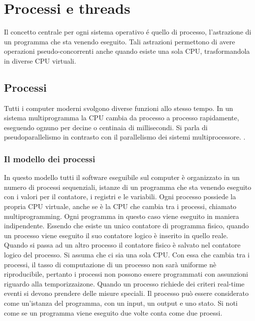 \chapter{Processi e threads}
Il concetto centrale per ogni sistema operativo \'e quello di processo, l'astrazione di un programma che sta venendo eseguito. Tali astrazioni permettono
di avere operazioni pseudo-concorrenti anche quando esiste una sola CPU, trasformandola in diverse CPU virtuali.
\section{Processi}
Tutti i computer moderni svolgono diverse funzioni allo stesso tempo. In un sistema multiprogramma la CPU cambia da processo a processo rapidamente,
eseguendo ognuno per decine o centinaia di millisecondi. Si parla di pseudoparallelismo in contrasto con il parallelismo dei sistemi multiprocessore. .
\subsection{Il modello dei processi}
In questo modello tutti il software eseguibile sul computer \`e organizzato in un numero di processi sequenziali, istanze di un programma che sta venendo eseguito con i valori per
il contatore, i registri e le variabili. Ogni processo possiede la propria CPU virtuale, anche se \`e la CPU che cambia tra i processi, chiamato multiprogramming. Ogni programma in
questo caso viene eseguito in maniera indipendente. Essendo che esiste un unico contatore di programma fisico, quando un processo viene eseguito il suo contatore logico \`e inserito
in quello reale. Quando si passa ad un altro processo il contatore fisico \`e salvato nel contatore logico del processo. Si assuma che ci sia una sola CPU. Con essa che cambia tra i
processi, il tasso di computazione di un processo non sar\`a uniforme n\`e riproducibile, pertanto i processi non possono essere programmati con assunzioni riguardo alla temporizzaizone.
Quando un processo richiede dei criteri real-time eventi si devono prendere delle misure speciali. Il processo pu\`o essere considerato come un'istanza del programma, con un input, un
output e uno stato. Si noti come se un programma viene eseguito due volte conta come due proessi.
